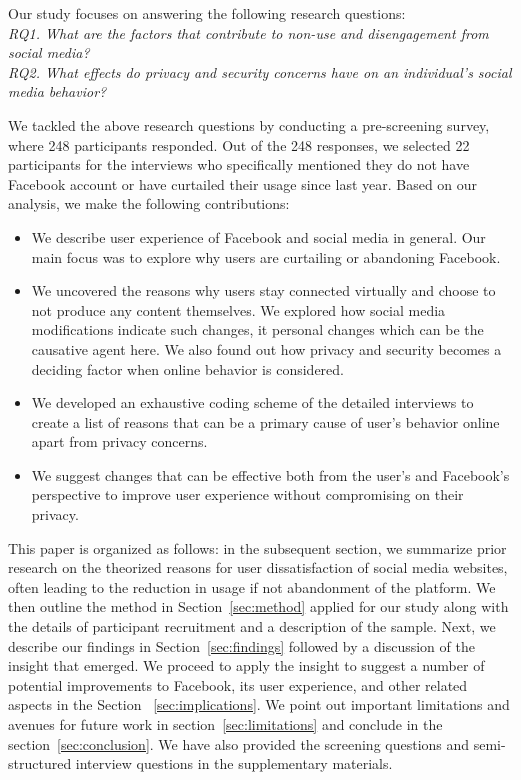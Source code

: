 Our study focuses on answering the following research questions:\\
\textit{RQ1. What are the factors that contribute to non-use and disengagement from social media?}\\
\textit{RQ2. What effects do privacy and security concerns have on an individual's social media behavior?}

We tackled the above research questions by conducting a pre-screening survey, where 248 participants responded. Out of the 248 responses, we selected 22 participants for the interviews who specifically mentioned they do not have Facebook account or have curtailed their usage since last year. Based on our analysis, we make the following contributions:
\begin{itemize}
    \item We describe user experience of Facebook and social media in general. Our main focus was to explore why users are curtailing or abandoning Facebook. 
    \item We uncovered the reasons why users stay connected virtually and choose to not produce any content themselves. We explored how social media modifications indicate such changes, it personal changes which can be the causative agent here. We also found out how privacy and security becomes a deciding factor when online behavior is considered.
    \item We developed an exhaustive coding scheme of the detailed interviews to create a list of reasons that can be a primary cause of user's behavior online apart from privacy concerns.
    \item We suggest changes that can be effective both from the user's and Facebook's perspective to improve user experience without compromising on their privacy.
\end{itemize}

This paper is organized as follows: in the subsequent section, we summarize prior research on the theorized reasons for user dissatisfaction of social media websites, often leading to the reduction in usage if not abandonment of the platform. We then outline the method in Section~\ref{sec:method} applied for our study along with the details of participant recruitment and a description of the sample. Next, we describe our findings in Section~\ref{sec:findings} followed by a discussion of the insight that emerged. We proceed to apply the insight to suggest a number of potential improvements to Facebook, its user experience, and other related aspects in the Section ~\ref{sec:implications}. We point out important limitations and avenues for future work in section~\ref{sec:limitations} and conclude in the section~\ref{sec:conclusion}. We have also provided the screening questions and semi-structured interview questions in the supplementary materials.

